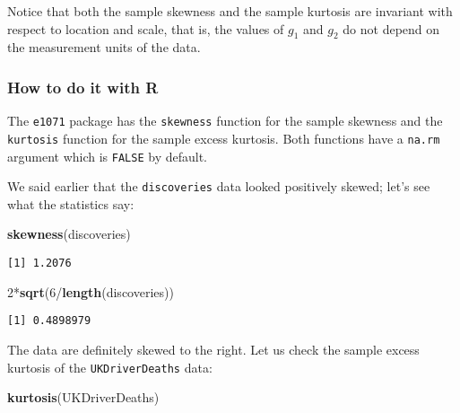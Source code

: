 \documentclass[]{book}
\newenvironment{Shaded}{\begin{snugshade}}{\end{snugshade}}
\newcommand{\KeywordTok}[1]{\textcolor[rgb]{0.13,0.29,0.53}{\textbf{{#1}}}}
\newcommand{\DecValTok}[1]{\textcolor[rgb]{0.00,0.00,0.81}{{#1}}}
\newcommand{\NormalTok}[1]{{#1}}
\numberwithin{equation}{chapter}
\numberwithin{figure}{chapter}
\theoremstyle{plain}
\theoremstyle{definition}
\theoremstyle{remark}
\theoremstyle{definition}
\theoremstyle{definition}
\theoremstyle{remark}
\let\BeginKnitrBlock\begin \let\EndKnitrBlock\end
\begin{document}
Notice that both the sample skewness and the sample kurtosis are
invariant with respect to location and scale, that is, the values of
\(g_{1}\) and \(g_{2}\) do not depend on the measurement units of the
data.

\subsubsection{How to do it with R}\label{how-to-do-it-with-r-3}

The \texttt{e1071} package \autocite{e1071} has the \texttt{skewness}
function for the sample skewness and the \texttt{kurtosis} function for
the sample excess kurtosis. Both functions have a \texttt{na.rm}
argument which is \texttt{FALSE} by default.

\bigskip

\BeginKnitrBlock{example}
\protect\hypertarget{ex:unnamed-chunk-56}{}{\label{ex:unnamed-chunk-56}}We
said earlier that the \texttt{discoveries} data looked positively
skewed; let's see what the statistics say:
\EndKnitrBlock{example}

\begin{Shaded}
\begin{Highlighting}[]
\KeywordTok{skewness}\NormalTok{(discoveries)}
\end{Highlighting}
\end{Shaded}

\begin{verbatim}
[1] 1.2076
\end{verbatim}

\begin{Shaded}
\begin{Highlighting}[]
\DecValTok{2}\NormalTok{*}\KeywordTok{sqrt}\NormalTok{(}\DecValTok{6}\NormalTok{/}\KeywordTok{length}\NormalTok{(discoveries))}
\end{Highlighting}
\end{Shaded}

\begin{verbatim}
[1] 0.4898979
\end{verbatim}

The data are definitely skewed to the right. Let us check the sample
excess kurtosis of the \texttt{UKDriverDeaths} data:

\begin{Shaded}
\begin{Highlighting}[]
\KeywordTok{kurtosis}\NormalTok{(UKDriverDeaths)}
\end{Highlighting}
\end{Shaded}
\end{document}
